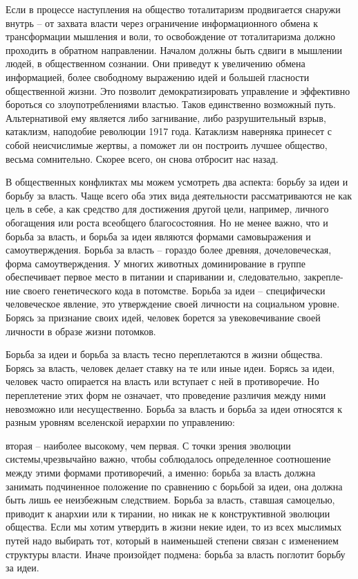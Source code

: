 \documentclass{book}
\begin{document}
Если в процессе наступления на общество тоталитаризм продвигается снаружи внутрь -- от захвата власти через огра­ничение информационного обмена к трансформации мышле­ния и воли, то освобождение от тоталитаризма должно прохо­дить в обратном направлении. Началом должны быть сдвиги в мышлении людей, в общественном сознании. Они приведут к увеличению обмена информацией, более свободному выра­жению идей и большей гласности общественной жизни. Это поз­волит демократизировать управление и эффективно бороться со злоупотреблениями властью. Таков единственно возможный путь. Альтернативой ему является либо загнивание, либо разрушительный взрыв, катаклизм, наподобие революции 1917 года. Катаклизм наверняка принесет с собой неисчислимые жертвы, а поможет ли он построить лучшее общество, весьма сомнительно. Скорее всего, он снова отбросит нас назад.

В общественных конфликтах мы можем усмотреть два ас­пекта: борьбу за идеи и борьбу за власть. Чаще всего оба этих вида деятельности рассматриваются не как цель в себе, а как средство для достижения другой цели, например, личного обогащения или роста всеобщего благосостояния. Но не менее важно, что и борьба за власть, и борьба за идеи являются формами самовыражения и самоутверждения. Борьба за власть -- гораздо более древняя, дочеловеческая, форма самоутверждения. У многих животных доминирование в группе обеспечивает пер­вое место в питании и спаривании и, следовательно, закрепле­ние своего генетического кода в потомстве. Борьба за идеи -- специфически человеческое явление, это утверждение своей личности на социальном уровне. Борясь за признание своих идей, человек борется за увековечивание своей личности в об­разе жизни потомков.

Борьба за идеи и борьба за власть тесно переплетаются в жиз­ни общества. Борясь за власть, человек делает ставку на те или иные идеи. Борясь за идеи, человек часто опирается на власть или вступает с ней в противоречие. Но переплетение этих форм не означает, что проведение различия между ними невозмож­но или несущественно. Борьба за власть и борьба за идеи отно­сятся к разным уровням вселенской иерархии по управлению:

вторая -- наиболее высокому, чем первая. С точки зрения эво­люции системы,чрезвычайно важно, чтобы соблюдалось опреде­ленное соотношение между этими формами противоречий, а именно: борьба за власть должна занимать подчиненное поло­жение по сравнению с борьбой за идеи, она должна быть лишь ее неизбежным следствием. Борьба за власть, ставшая само­целью, приводит к анархии или к тирании, но никак не к кон­структивной эволюции общества. Если мы хотим утвердить в жизни некие идеи, то из всех мыслимых путей надо выбирать тот, который в наименьшей степени связан с изменением струк­туры власти. Иначе произойдет подмена: борьба за власть по­глотит борьбу за идеи.
\end{document}
